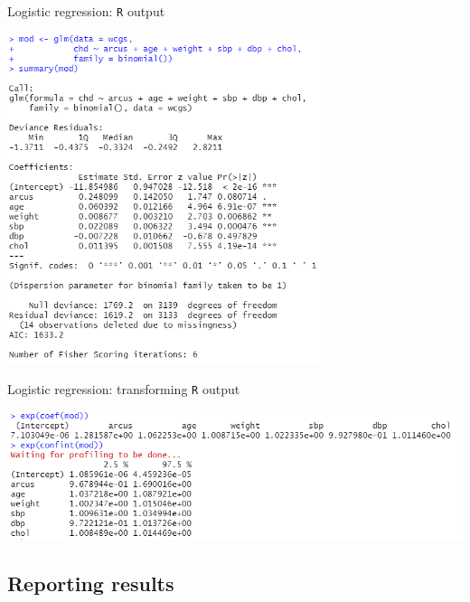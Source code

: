 \documentclass[10pt,t]{beamer}
\begin{document}
\begin{frame}{Logistic regression: \texttt{R} output}
	\vspace{-1cm}
		\begin{center}
		\includegraphics[width=0.7\textwidth]{./figs/multiple_logistic_regression_arcus}
	\end{center}
\end{frame}

\begin{frame}{Logistic regression: transforming \texttt{R} output}
	\vspace{-0.7cm}
	\begin{center}
		\includegraphics[width=\textwidth]{./figs/multiple_logistic_regression_arcus_exp}
	\end{center}
\end{frame}

\subsection{Reporting results}
\end{document}
